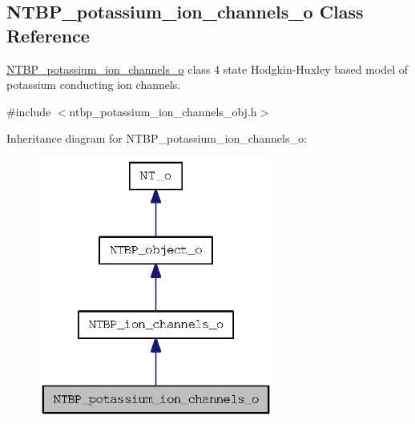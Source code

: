 \subsection{NTBP\_\-potassium\_\-ion\_\-channels\_\-o Class Reference}
\label{class_n_t_b_p__potassium__ion__channels__o}


\hyperlink{class_n_t_b_p__potassium__ion__channels__o}{NTBP\_\-potassium\_\-ion\_\-channels\_\-o} class 4 state Hodgkin-\/Huxley based model of potassium conducting ion channels.  




{\ttfamily \#include $<$ntbp\_\-potassium\_\-ion\_\-channels\_\-obj.h$>$}



Inheritance diagram for NTBP\_\-potassium\_\-ion\_\-channels\_\-o:
\nopagebreak
\begin{figure}[H]
\begin{center}
\leavevmode
\includegraphics[width=220pt]{class_n_t_b_p__potassium__ion__channels__o__inherit__graph}
\end{center}
\end{figure}


